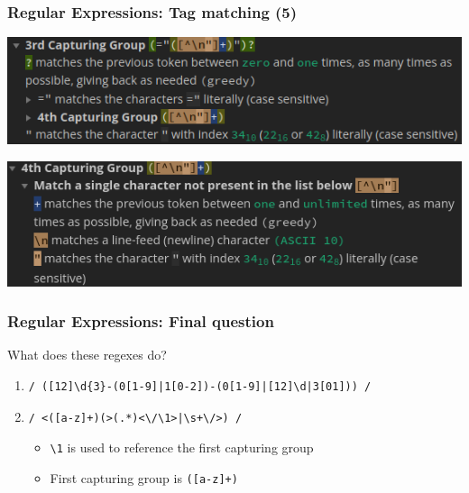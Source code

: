 \documentclass{beamer}
\begin{document}
\begin{frame}[fragile]
    \frametitle{Regular Expressions: Tag matching (5)}
    \begin{center}
        \includegraphics[width=1.0\textwidth]{pics/regex/regex_tag3.png}
    \end{center}
    \begin{center}
        \includegraphics[width=1.0\textwidth]{pics/regex/regex_tag4.png}
    \end{center}
\end{frame}


\begin{frame}[fragile]
    \frametitle{Regular Expressions: Final question}
    \begin{center}
        What does these regexes do?
    \end{center}
    \vspace{1em}
    \begin{enumerate}
        \item \begin{verbatim}/ ([12]\d{3}-(0[1-9]|1[0-2])-(0[1-9]|[12]\d|3[01])) /\end{verbatim}
        \vspace{1em}
        \item \begin{verbatim}/ <([a-z]+)(>(.*)<\/\1>|\s+\/>) /\end{verbatim}
        \begin{itemize}
            \item \texttt{\textbackslash 1} is used to reference the first capturing group
            \item First capturing group is \texttt{([a-z]+)}
        \end{itemize}
    \end{enumerate}
\end{frame}
\end{document}
